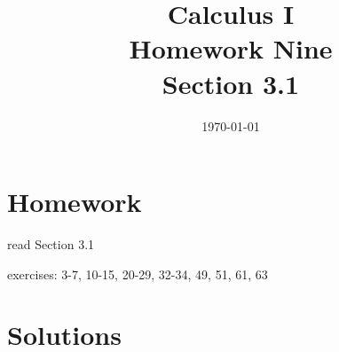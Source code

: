 \documentclass[letterpaper]{exam}
\title{Calculus I \\ Homework Nine \\ Section 3.1}
\author{}
\date{\today}
\begin{document}
  \maketitle

  \section{Homework}
    \begin{itemize*}
      \item read Section 3.1
      \item exercises: 3-7, 10-15, 20-29, 32-34, 49, 51, 61, 63
    \end{itemize*}

  \ifprintanswers

  \section{Solutions}
\end{document}
